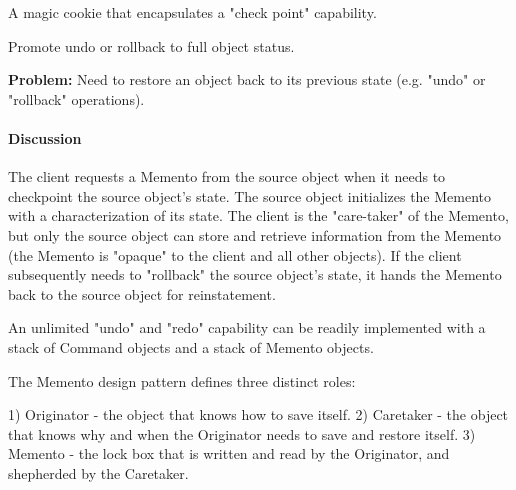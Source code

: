 \documentclass{book}
\begin{document}
    A magic cookie that encapsulates a "check point" capability.

    Promote undo or rollback to full object status.

\textbf{Problem:} Need to restore an object back to its previous state (e.g. "undo" or "rollback" operations).
\paragraph{Discussion}
The client requests a Memento from the source object when it needs to checkpoint the source object's state.
The source object initializes the Memento with a characterization of its state.
The client is the "care-taker" of the Memento, but only the source object can store and retrieve information from the Memento (the Memento is "opaque" to the client and all other objects).
If the client subsequently needs to "rollback" the source object's state, it hands the Memento back to the source object for reinstatement.

An unlimited "undo" and "redo" capability can be readily implemented with a stack of Command objects and a stack of Memento objects.

The Memento design pattern defines three distinct roles:

1)    Originator - the object that knows how to save itself.
2)    Caretaker - the object that knows why and when the Originator needs to save and restore itself.
3)    Memento - the lock box that is written and read by the Originator, and shepherded by the Caretaker.

\begin{figure}[H]
\begin{floatrow}
\end{floatrow}
\end{figure}
\end{document}

